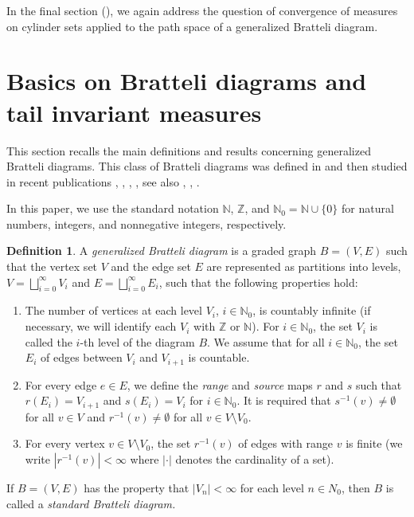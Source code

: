 \documentclass[11pt,reqno]{amsart}
\theoremstyle{definition}
\newtheorem{definition}{Definition}[section]
\theoremstyle{remark}
\theoremstyle{plain}
\newcommand{\N}{\mathbb N}
\newcommand{\Z}{\mathbb Z}
\numberwithin{equation}{section}
\begin{document}
In the final section (), we again address the question of convergence of measures on cylinder sets applied to the path space of a generalized Bratteli diagram. 
\medskip



\section{Basics on Bratteli diagrams and tail invariant
measures}\label{Sec: Basics}


This section recalls the main definitions and results
concerning generalized Bratteli diagrams. This class of Bratteli diagrams was defined in \cite{BezuglyiDooleyKwiatkowski_2006} and then studied in recent publications
 \cite{BezuglyiJorgensen2022}, 
\cite{BezuglyiJorgensenKarpelSanadhya2025}, \cite{Bezuglyi_Jorgensen_Sanadhya_2023}, \cite{BezuglyiKarpelKwiatkowski2024}, see also \cite{BezuglyiKarpelKwiatkowskiWata2024}, \cite{BezuglyiJorgensenKarpelKwiatkowski2025}, \cite{BezuglyiDudkoKarpel2024}. 

In this paper, we use the standard notation $\N$, $\Z$, and $\N_0 = \N \cup \{0\}$ for natural numbers, integers, and nonnegative integers, respectively.  

\begin{definition}\label{Def:generalized_BD} A 
\textit{generalized Bratteli diagram} is a graded graph 
$B = (V, E)$ such that the vertex set $V$ and the edge set $E$ are represented as partitions into levels, $V = \bigsqcup_{i=0}^\infty  V_i$ and $E = \bigsqcup_{i=0}^\infty  E_i$, such that the following properties hold:
\begin{enumerate}[label=(\roman*)]
  \item The number of vertices at each level $V_i$, $i \in \N_0$, is countably infinite (if necessary, we will identify each $V_i$ with $\Z$ or $\N$). For $i \in \N_0$, the set $V_i$ is called the $i$-th level of the diagram $B$. We assume that for all $i \in \N_0$, 
the set $E_i$ of edges between $V_i$ and $V_{i+1}$ is countable.
  \item For every edge $e\in E$, we define the \textit{range} and \textit{source} maps $r$ and $s$ such that $r(E_i) = V_{i+1}$ and $s(E_i) = V_{i}$ for $i \in \N_0$. It is required that $s^{-1}(v)\neq \emptyset$ for all $v\in V$ and $r^{-1}(v)\neq\emptyset$ for all $v \in V\setminus V_0$.
  
  \item For every vertex $v \in V \setminus V_0$, the set $r^{-1}(v)$ of edges with range $v$ is finite (we write $|r^{-1}(v)| < \infty$ where $|\cdot|$ denotes the cardinality of a set). 
\end{enumerate} 
If $B =(V, E)$ has the property that $|V_n| < \infty$ for each level $n \in N_0$, then $B$ is called a \textit{standard Bratteli diagram.}
\end{definition} 
\end{document}
